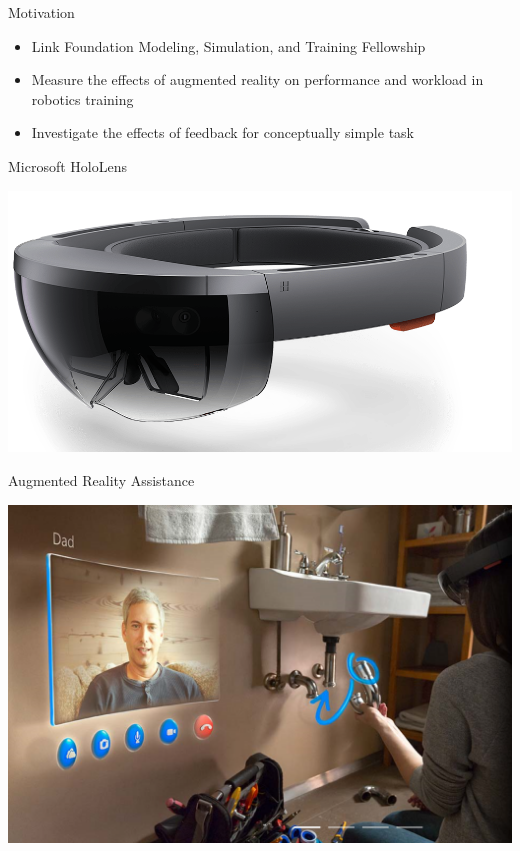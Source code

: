 \documentclass[10pt]{beamer}
\begin{document}
\begin{frame}[fragile]{Motivation}
  \begin{itemize}
    \setlength\itemsep{1em}
    \item Link Foundation Modeling, Simulation, and Training Fellowship
    \item Measure the effects of augmented reality on performance and workload in robotics training
    \item Investigate the effects of feedback for conceptually simple task
  \end{itemize}
\end{frame}

\begin{frame}[fragile]{Microsoft HoloLens}
  \begin{center}
    \includegraphics[width=\textwidth]{../img/Hololens.png}
  \end{center}
\end{frame}

\begin{frame}[fragile]{Augmented Reality Assistance}
  \begin{center}
    \includegraphics[width=\textwidth]{../img/sink.png}
  \end{center}
\end{frame}
\end{document}
